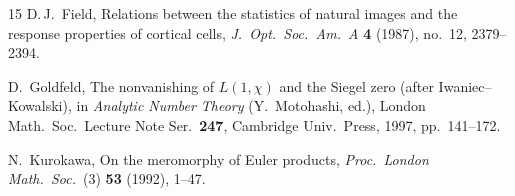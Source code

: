 \documentclass[11pt]{amsart}
\begin{document}
\begin{thebibliography}{15}
D.\,J.~Field,
Relations between the statistics of natural images and the response
properties of cortical cells,
\emph{J.\ Opt.\ Soc.\ Am.\ A} \textbf{4} (1987), no.~12, 2379--2394.

D.~Goldfeld,
The nonvanishing of $L(1,\chi)$ and the Siegel zero (after
Iwaniec--Kowalski),
in \emph{Analytic Number Theory} (Y.~Motohashi, ed.),
London Math.\ Soc.\ Lecture Note Ser.\ \textbf{247},
Cambridge Univ.\ Press, 1997, pp.~141--172.

N.~Kurokawa,
On the meromorphy of Euler products,
\emph{Proc.\ London Math.\ Soc.}\ (3) \textbf{53} (1992), 1--47.

\end{thebibliography}
\end{document}
